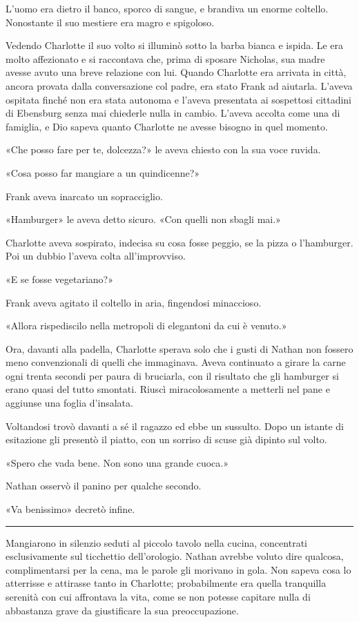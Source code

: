 \documentclass[a4paper,oneside,11pt]{memoir}
\begin{document}
L'uomo era dietro il banco, sporco di sangue, e brandiva un enorme coltello. Nonostante il suo mestiere era magro e
spigoloso.

Vedendo Charlotte il suo volto si illuminò sotto la barba bianca e ispida. Le era molto affezionato e si raccontava
che, prima di sposare Nicholas, sua madre avesse avuto una breve relazione con lui. Quando Charlotte era arrivata in
città, ancora provata dalla conversazione col padre, era stato Frank ad aiutarla. L'aveva ospitata finché non era
stata autonoma e l'aveva presentata ai sospettosi cittadini di Ebensburg senza mai chiederle nulla in cambio. L'aveva
accolta come una di famiglia, e Dio sapeva quanto Charlotte ne avesse bisogno in quel momento.

«Che posso fare per te, dolcezza?» le aveva chiesto con la sua voce ruvida.

«Cosa posso far mangiare a un quindicenne?»

Frank aveva inarcato un sopracciglio.

«Hamburger» le aveva detto sicuro. «Con quelli non sbagli mai.»

Charlotte aveva sospirato, indecisa su cosa fosse peggio, se la pizza o l'hamburger. Poi un dubbio l'aveva colta
all'improvviso.

«E se fosse vegetariano?»

Frank aveva agitato il coltello in aria, fingendosi minaccioso.

«Allora rispediscilo nella metropoli di elegantoni da cui è venuto.»

Ora, davanti alla padella, Charlotte sperava solo che i gusti di Nathan non fossero meno convenzionali di quelli che
immaginava. Aveva continuato a girare la carne ogni trenta secondi per paura di bruciarla, con il risultato che gli
hamburger si erano quasi del tutto smontati. Riuscì miracolosamente a metterli nel pane e aggiunse una foglia
d'insalata.

Voltandosi trovò davanti a sé il ragazzo ed ebbe un sussulto. Dopo un istante di esitazione gli presentò il piatto,
con un sorriso di scuse già dipinto sul volto.

«Spero che vada bene. Non sono una grande cuoca.»

Nathan osservò il panino per qualche secondo.

«Va benissimo» decretò infine.

\plainbreak{1}

Mangiarono in silenzio seduti al piccolo tavolo nella cucina, concentrati esclusivamente sul ticchettio dell'orologio.
Nathan avrebbe voluto dire qualcosa, complimentarsi per la cena, ma le parole gli morivano in gola. Non sapeva cosa lo
atterrisse e attirasse tanto in Charlotte; probabilmente era quella tranquilla serenità con cui affrontava la vita,
come se non potesse capitare nulla di abbastanza grave da giustificare la sua preoccupazione.
\end{document}
